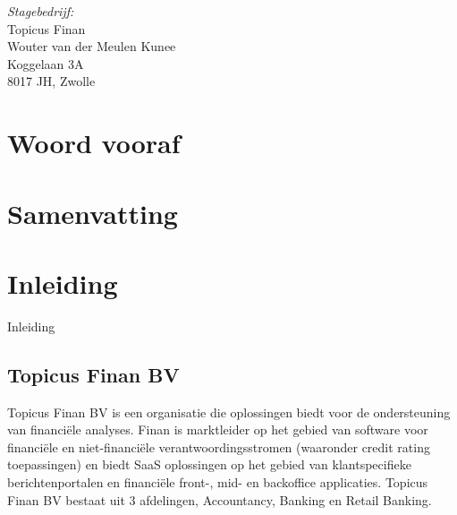 \documentclass[a4paper,12pt,oneside]{report}
\begin{document}
\emph{Stagebedrijf:}\\
    Topicus Finan\\
	Wouter van der Meulen Kunee\\
	Koggelaan 3A\\
	8017 JH, Zwolle



\chapter*{Woord vooraf}
\lipsum[1]

\chapter*{Samenvatting}
\lipsum[1]





\newpage
\renewcommand*\contentsname{Inhoud}
\tableofcontents
\cleardoublepage 
{}





\chapter{Inleiding} 
Inleiding


\section{Topicus Finan BV} 
Topicus Finan BV is een organisatie die oplossingen biedt voor de ondersteuning van financiële analyses.
Finan is marktleider op het gebied van software voor financiële en niet-financiële verantwoordingsstromen (waaronder credit rating toepassingen) en biedt SaaS oplossingen op het gebied van klantspecifieke berichtenportalen en financiële front-, mid- en backoffice applicaties. 
Topicus Finan BV bestaat uit 3 afdelingen, Accountancy, Banking en Retail Banking. 
\end{document}
